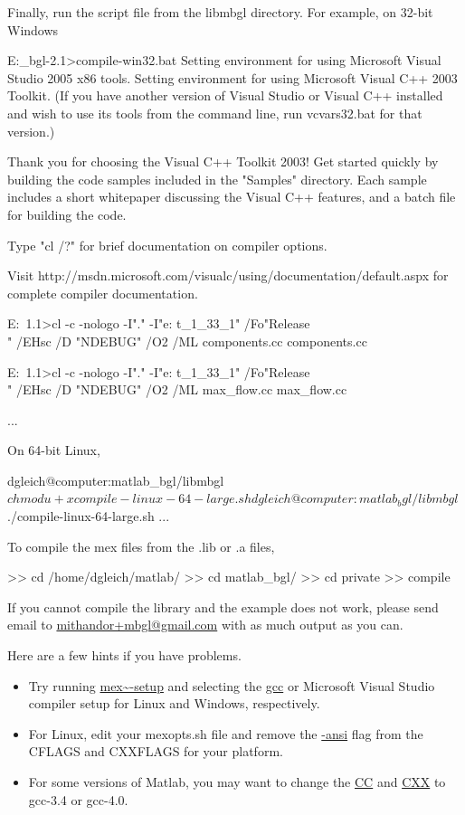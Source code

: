 \documentclass[12pt]{article}
\newcommand{\mycmd}[1]{\url{#1}}
\begin{document}
Finally, run the script file from the libmbgl directory.  For example, on 32-bit Windows
\begin{mcode}
E:\dev\matlab\download\matlab_bgl-2.1\libmbgl>compile-win32.bat
Setting environment for using Microsoft Visual Studio 2005 x86 tools.
Setting environment for using Microsoft Visual C++ 2003 Toolkit.
(If you have another version of Visual Studio or Visual C++ installed and wish
to use its tools from the command line, run vcvars32.bat for that version.)

Thank you for choosing the Visual C++ Toolkit 2003!  Get started quickly by
building the code samples included in the "Samples" directory.  Each sample
includes a short whitepaper discussing the Visual C++ features, and a batch
file for building the code.

Type "cl /?" for brief documentation on compiler options.

Visit http://msdn.microsoft.com/visualc/using/documentation/default.aspx for
complete compiler documentation.

E:\dev\matlab\download\MATLAB~1.1\libmbgl>cl -c -nologo -I"." -I"e:\dev\lib\boos
t_1_33_1" /Fo"Release\\" /EHsc /D "NDEBUG" /O2 /ML components.cc
components.cc

E:\dev\matlab\download\MATLAB~1.1\libmbgl>cl -c -nologo -I"." -I"e:\dev\lib\boos
t_1_33_1" /Fo"Release\\" /EHsc /D "NDEBUG" /O2 /ML max_flow.cc
max_flow.cc

...
\end{mcode}
On 64-bit Linux, 
\begin{mcode}
dgleich@computer:matlab_bgl/libmbgl$ chmod u+x compile-linux-64-large.sh
dgleich@computer:matlab_bgl/libmbgl$ ./compile-linux-64-large.sh
...
\end{mcode}

To compile the mex files from the .lib or .a files, 
\begin{mcode}
>> cd /home/dgleich/matlab/ %
>> cd matlab_bgl/
>> cd private
>> compile
\end{mcode}
If you cannot compile the library and the example does not work, please send email to \url{mithandor+mbgl@gmail.com} with as much output as you can.  

Here are a few hints if you have problems.
\begin{itemize}
\item Try running \mycmd{mex~-setup} and selecting the \mycmd{gcc} or Microsoft Visual Studio compiler setup for Linux and Windows, respectively.
\item For Linux, edit your mexopts.sh file and remove the \mycmd{-ansi} flag from the CFLAGS and CXXFLAGS for your platform.
\item For some versions of Matlab, you may want to change the \mycmd{CC} and \mycmd{CXX} to gcc-3.4 or gcc-4.0.
\end{itemize}
\end{document}
